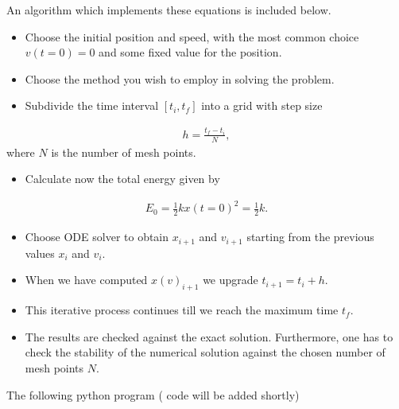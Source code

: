 \documentclass[letterpaper,10pt,english]{sphinxmanual}
\begin{document}
An algorithm which implements these equations is included below.
\begin{itemize}
\item {} 
Choose the initial position and speed, with the most common choice \(v(t=0)=0\) and some fixed value for the position.

\item {} 
Choose the method you wish to employ in solving the problem.

\item {} 
Subdivide the time interval \([t_i,t_f] \) into a grid with step size

\end{itemize}
\begin{equation*}
\begin{split}
h=\frac{t_f-t_i}{N},
\end{split}
\end{equation*}
where \(N\) is the number of mesh points.
\begin{itemize}
\item {} 
Calculate now the total energy given by

\end{itemize}
\begin{equation*}
\begin{split}
E_0=\frac{1}{2}kx(t=0)^2=\frac{1}{2}k.
\end{split}
\end{equation*}\begin{itemize}
\item {} 
Choose ODE solver to obtain \(x_{i+1}\) and \(v_{i+1}\) starting from the previous values \(x_i\) and \(v_i\).

\item {} 
When we have computed \(x(v)_{i+1}\) we upgrade  \(t_{i+1}=t_i+h\).

\item {} 
This iterative  process continues till we reach the maximum time \(t_f\).

\item {} 
The results are checked against the exact solution. Furthermore, one has to check the stability of the numerical solution against the chosen number of mesh points \(N\).

\end{itemize}

The following python program ( code will be added shortly)
\end{document}
